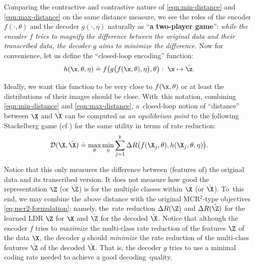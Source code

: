 \documentclass[../../book-main.tex]{subfiles}
\begin{document}
Comparing the contractive and contrastive nature of \eqref{eqn:min-distance} and \eqref{eqn:max-distance} on the same distance measure, we see the roles of the encoder $f(\cdot, \theta)$ and the decoder $g(\cdot, \eta)$ naturally as ``{\bf a  two-player game}'': {\em while the encoder $f$ tries to magnify the difference between the original data and their transcribed data, the decoder $g$ aims to minimize the difference.} Now for convenience, let us define the ``closed-loop encoding'' function:
\begin{equation}
    h(\x, \theta, \eta) \doteq f\big(g\big(f(\x, \theta), \eta\big), \theta\big): \; \x \mapsto \hat \z.
\end{equation}

Ideally, we want this function to be very close to $f(\x, \theta)$ or at least the distributions of their images should be close. With~this notation, combining \eqref{eqn:min-distance} and \eqref{eqn:max-distance}, a~closed-loop notion of ``distance'' between $\X$ and $\hat \X$ can be computed as {\em an equilibrium point} to the following Stackelberg game (cf ) for the same utility in terms of rate reduction:%
\begin{equation}
\mathcal{D}(\X, \hat \X) \doteq  \max_\theta \min_\eta \sum_{j=1}^k \Delta R\big(f(\X_j,\theta), h(\X_j,\theta,\eta)\big).
    \label{eq:MCR2-GAN-pair}
\end{equation}

Notice that this only measures the difference between (features of) the original data and its transcribed version. It does not measure how good the representation $\Z$ (or $\hat \Z$) is for the multiple classes within $\X$ (or $\hat \X$). To~this end, we may combine the above distance with the original MCR$^2$-type objectives  \eqref{eq:mcr2-formulation}: namely, the~rate reduction $\Delta R(\Z)$ and $\Delta R(\hat \Z)$ for the learned LDR $\Z$ for $\X$ and $\hat \Z$ for the decoded $\hat \X$. Notice that although the encoder $f$ tries to {\em maximize} the multi-class rate reduction of the features $\Z$ of the data $\X$,  the decoder $g$ should {\em minimize} the rate reduction of the multi-class  features $\hat \Z$ of the decoded $\hat \X$. That is, the decoder $g$ tries to use a minimal  coding rate needed to achieve a good decoding~quality. 
\end{document}

